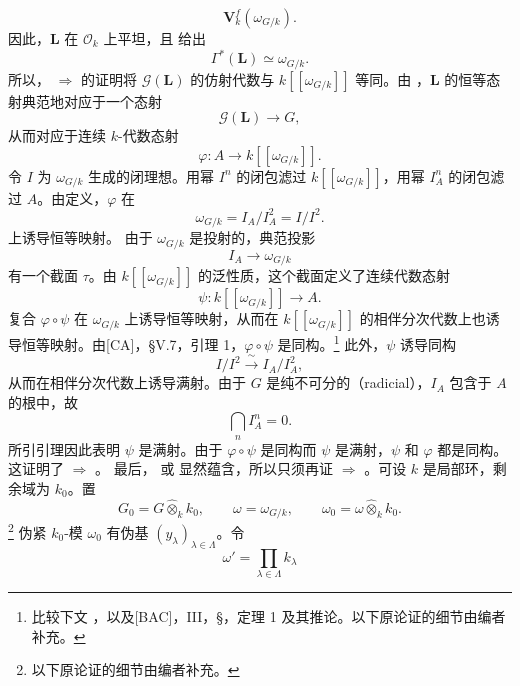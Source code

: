 \[
  \mathbf V_k^f(\omega_{G/k}).
\]
因此，\(\mathbf L\) 在 \(\mathcal O_k\) 上平坦，且 给出
\[
  \Gamma^*(\mathbf L)\simeq\omega_{G/k}.
\]
所以，\textup{} \(\Rightarrow\) \textup{} 的证明将 \(\mathscr G(\mathbf L)\) 的仿射代数与 \(k[[\omega_{G/k}]]\) 等同。由 ，\(\mathbf L\) 的恒等态射典范地对应于一个态射
\[
  \mathscr G(\mathbf L)\longrightarrow G,
\]
从而对应于连续 \(k\)-代数态射
\[
  \varphi:A\longrightarrow k[[\omega_{G/k}]].
\]
令 \(I\) 为 \(\omega_{G/k}\) 生成的闭理想。用幂 \(I^n\) 的闭包滤过 \(k[[\omega_{G/k}]]\)，用幂 \(I_A^n\) 的闭包滤过 \(A\)。由定义，\(\varphi\) 在
\[
  \omega_{G/k}=I_A/I_A^2=I/I^2.
\]
上诱导恒等映射。
由于 \(\omega_{G/k}\) 是投射的，典范投影
\[
  I_A\longrightarrow\omega_{G/k}
\]
有一个截面 \(\tau\)。由 \(k[[\omega_{G/k}]]\) 的泛性质，这个截面定义了连续代数态射
\[
  \psi:k[[\omega_{G/k}]]\longrightarrow A.
\]
复合 \(\varphi\circ\psi\) 在 \(\omega_{G/k}\) 上诱导恒等映射，从而在 \(k[[\omega_{G/k}]]\) 的相伴分次代数上也诱导恒等映射。由\textup{[CA]，\S V.7，引理 1}，\(\varphi\circ\psi\) 是同构。\footnote{\label{sga3:VIIB:nde:126}比较下文 ，以及\textup{[BAC]，III，\S {}，定理 1 及其推论}。以下原论证的细节由编者补充。}
此外，\(\psi\) 诱导同构
\[
  I/I^2\xrightarrow{\ \sim\ }I_A/I_A^2,
\]
从而在相伴分次代数上诱导满射。由于 \(G\) 是纯不可分的（radicial），\(I_A\) 包含于 \(A\) 的根中，故
\[
  \bigcap_n I_A^n=0.
\]
所引引理因此表明 \(\psi\) 是满射。由于 \(\varphi\circ\psi\) 是同构而 \(\psi\) 是满射，\(\psi\) 和 \(\varphi\) 都是同构。这证明了\textup{} \(\Rightarrow\) \textup{}。
\medskip
最后，\textup{} 或\textup{} 显然蕴含\textup{}，所以只须再证\textup{} \(\Rightarrow\) \textup{}。可设 \(k\) 是局部环，剩余域为 \(k_0\)。置
\[
  G_0=G\widehat\otimes_kk_0,
  \qquad
  \omega=\omega_{G/k},
  \qquad
  \omega_0=\omega\widehat\otimes_kk_0.
\]
\footnote{\label{sga3:VIIB:nde:127}以下原论证的细节由编者补充。}
伪紧 \(k_0\)-模 \(\omega_0\) 有伪基 \((y_\lambda)_{\lambda\in\Lambda}\)。令
\[
  \omega'=\prod_{\lambda\in\Lambda}k_\lambda
\]
